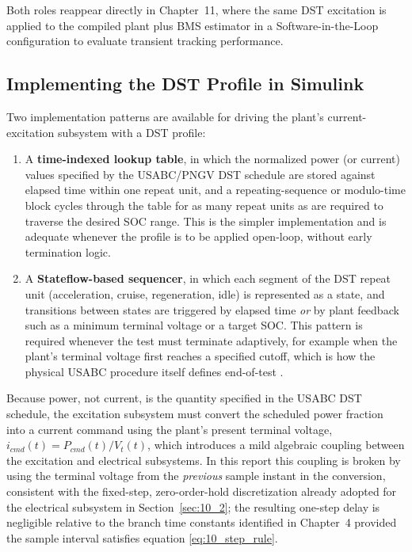 Both roles reappear directly in Chapter~11, where the same DST
excitation is applied to the compiled plant plus BMS estimator in a
Software-in-the-Loop configuration to evaluate transient tracking
performance.

\subsection{Implementing the DST Profile in Simulink}

Two implementation patterns are available for driving the plant's
current-excitation subsystem with a DST profile:

\begin{enumerate}
    \item A \textbf{time-indexed lookup table}, in which the
    normalized power (or current) values specified by the USABC/PNGV
    DST schedule are stored against elapsed time within one repeat
    unit, and a repeating-sequence or modulo-time block cycles through
    the table for as many repeat units as are required to traverse the
    desired SOC range. This is the simpler implementation and is
    adequate whenever the profile is to be applied open-loop, without
    early termination logic.
    \item A \textbf{Stateflow-based sequencer}, in which each segment
    of the DST repeat unit (acceleration, cruise, regeneration, idle)
    is represented as a state, and transitions between states are
    triggered by elapsed time \emph{or} by plant feedback such as a
    minimum terminal voltage or a target SOC. This pattern is required
    whenever the test must terminate adaptively, for example when the
    plant's terminal voltage first reaches a specified cutoff, which
    is how the physical USABC procedure itself defines end-of-test
    \cite{usabc_manual}.
\end{enumerate}

Because power, not current, is the quantity specified in the USABC DST
schedule, the excitation subsystem must convert the scheduled power
fraction into a current command using the plant's present terminal
voltage, $i_{cmd}(t) = P_{cmd}(t) / V_t(t)$, which introduces a mild
algebraic coupling between the excitation and electrical subsystems.
In this report this coupling is broken by using the terminal voltage
from the \emph{previous} sample instant in the conversion, consistent
with the fixed-step, zero-order-hold discretization already adopted
for the electrical subsystem in Section~\ref{sec:10_2}; the resulting
one-step delay is negligible relative to the branch time constants
identified in Chapter~4 provided the sample interval satisfies
equation \eqref{eq:10_step_rule}.

